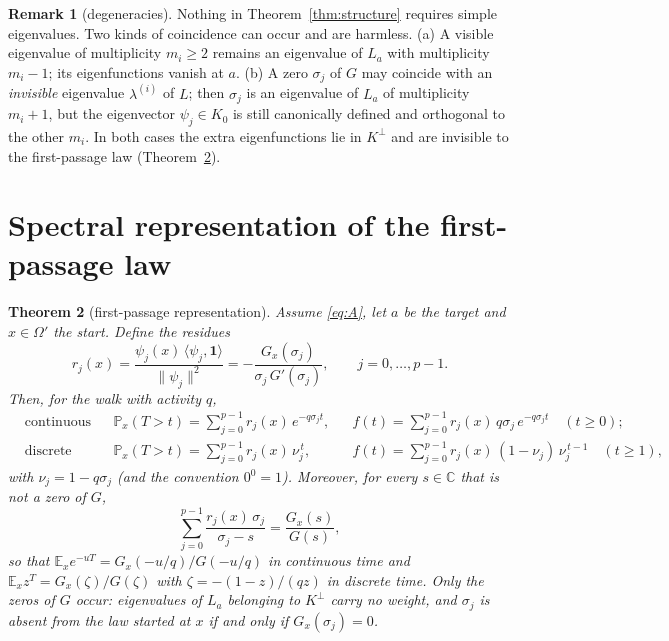 \documentclass[11pt,a4paper]{article}
\newcommand{\one}{\mathbf 1}
\newcommand{\E}{\mathbb E}
\newcommand{\PP}{\mathbb P}
\newcommand{\ip}[2]{\langle #1,#2\rangle}
\theoremstyle{plain}
\newtheorem{theorem}{Theorem}[section]
\theoremstyle{definition}
\newtheorem{remark}[theorem]{Remark}
\numberwithin{equation}{section}
\begin{document}
\begin{remark}[degeneracies]\label{rem:degenerate}
Nothing in Theorem~\ref{thm:structure} requires simple eigenvalues. Two kinds of coincidence can occur and are harmless.
(a) A visible eigenvalue of multiplicity $m_i\ge2$ remains an eigenvalue of $L_a$ with multiplicity $m_i-1$; its eigenfunctions vanish at $a$.
(b) A zero $\sigma_j$ of $G$ may coincide with an \emph{invisible} eigenvalue $\lambda^{(i)}$ of $L$; then $\sigma_j$ is an eigenvalue of $L_a$ of multiplicity $m_i+1$, but the eigenvector $\psi_j\in K_0$ is still canonically defined and orthogonal to the other $m_i$.
In both cases the extra eigenfunctions lie in $K^\perp$ and are invisible to the first-passage law (Theorem~\ref{thm:fpt}).
\end{remark}

\section{Spectral representation of the first-passage law}\label{sec:fpt}

\begin{theorem}[first-passage representation]\label{thm:fpt}
Assume \eqref{eq:A}, let $a$ be the target and $x\in\Omega'$ the start. Define the \emph{residues}
\begin{equation}\label{eq:res}
r_j(x)=\frac{\psi_j(x)\,\ip{\psi_j}{\one}}{\|\psi_j\|^2}=-\frac{G_x(\sigma_j)}{\sigma_j\,G'(\sigma_j)},\qquad j=0,\dots,p-1 .
\end{equation}
Then, for the walk with activity $q$,
\begin{align}
&\text{continuous time:}&&\PP_x(T>t)=\sum_{j=0}^{p-1}r_j(x)\,e^{-q\sigma_jt},&&f(t)=\sum_{j=0}^{p-1}r_j(x)\,q\sigma_j\,e^{-q\sigma_jt}\quad(t\ge0);\label{eq:cont}\\
&\text{discrete time:}&&\PP_x(T>t)=\sum_{j=0}^{p-1}r_j(x)\,\nu_j^{\,t},&&f(t)=\sum_{j=0}^{p-1}r_j(x)\,(1-\nu_j)\,\nu_j^{\,t-1}\quad(t\ge1),\label{eq:disc}
\end{align}
with $\nu_j=1-q\sigma_j$ (and the convention $0^0=1$). Moreover, for every $s\in\mathbb C$ that is not a zero of $G$,
\begin{equation}\label{eq:renewal}
\sum_{j=0}^{p-1}\frac{r_j(x)\,\sigma_j}{\sigma_j-s}=\frac{G_x(s)}{G(s)} ,
\end{equation}
so that $\E_x e^{-uT}=G_x(-u/q)/G(-u/q)$ in continuous time and $\E_x z^{T}=G_x(\zeta)/G(\zeta)$ with $\zeta=-(1-z)/(qz)$ in discrete time.
Only the zeros of $G$ occur: eigenvalues of $L_a$ belonging to $K^\perp$ carry no weight, and $\sigma_j$ is absent from the law started at $x$ if and only if $G_x(\sigma_j)=0$.
\end{theorem}
\end{document}
